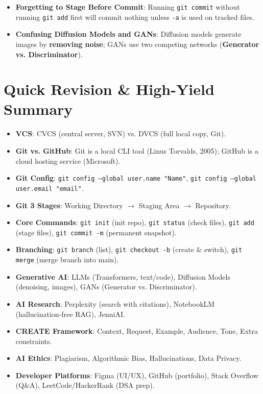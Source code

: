 \begin{commonmistake}
\begin{itemize}
    \item \textbf{Forgetting to Stage Before Commit}: Running \texttt{git commit} without running \texttt{git add} first will commit nothing unless \texttt{-a} is used on tracked files.
    \item \textbf{Confusing Diffusion Models and GANs}: Diffusion models generate images by \textbf{removing noise}; GANs use two competing networks (\textbf{Generator vs. Discriminator}).
\end{itemize}
\end{commonmistake}

\section{Quick Revision \& High-Yield Summary}

\begin{quickrevision}
\begin{itemize}
    \item \textbf{VCS}: CVCS (central server, SVN) vs. DVCS (full local copy, Git).
    \item \textbf{Git vs. GitHub}: Git is a local CLI tool (Linus Torvalds, 2005); GitHub is a cloud hosting service (Microsoft).
    \item \textbf{Git Config}: \texttt{git config --global user.name "Name"}, \texttt{git config --global user.email "email"}.
    \item \textbf{Git 3 Stages}: Working Directory $\rightarrow$ Staging Area $\rightarrow$ Repository.
    \item \textbf{Core Commands}: \texttt{git init} (init repo), \texttt{git status} (check files), \texttt{git add} (stage files), \texttt{git commit -m} (permanent snapshot).
    \item \textbf{Branching}: \texttt{git branch} (list), \texttt{git checkout -b} (create \& switch), \texttt{git merge} (merge branch into main).
    \item \textbf{Generative AI}: LLMs (Transformers, text/code), Diffusion Models (denoising, images), GANs (Generator vs. Discriminator).
    \item \textbf{AI Research}: Perplexity (search with citations), NotebookLM (hallucination-free RAG), JenniAI.
    \item \textbf{CREATE Framework}: Context, Request, Example, Audience, Tone, Extra constraints.
    \item \textbf{AI Ethics}: Plagiarism, Algorithmic Bias, Hallucinations, Data Privacy.
    \item \textbf{Developer Platforms}: Figma (UI/UX), GitHub (portfolio), Stack Overflow (Q\&A), LeetCode/HackerRank (DSA prep).
\end{itemize}
\end{quickrevision}

